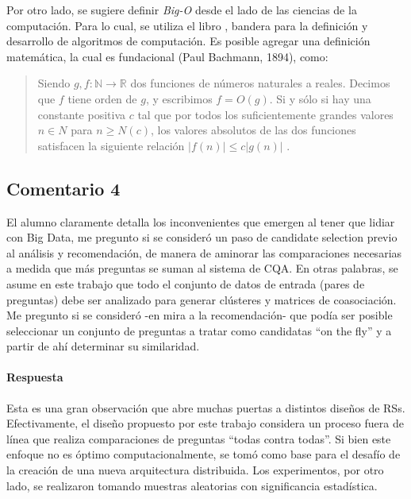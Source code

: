 \bigskip

Por otro lado, se sugiere definir \textit{Big-O} desde el lado de las ciencias de la computación. Para lo cual, se utiliza el libro \citep{cormen2009introduction}, bandera para la definición y desarrollo de algoritmos de computación. Es posible agregar una definición matemática, la cual es fundacional (Paul Bachmann, 1894), como:

\begin{quotation}
	Siendo \(g,f: \mathbb{N} \rightarrow \mathbb{R}\)  dos funciones de números naturales a reales. Decimos que \(f\) tiene orden de \(g\), y escribimos \(f=O(g)\). Si y sólo si hay una constante positiva \(c\) tal que por todos los suficientemente grandes valores \(n \in N\) para \(n \geq N(c)\), los valores absolutos de las dos funciones satisfacen la siguiente relación \(\left | f(n) \right | \leq c\left | g(n) \right |\) \citep{erk2008theoretische}.
\end{quotation}

\subsection*{Comentario 4}
El alumno claramente detalla los inconvenientes que emergen al tener que lidiar con Big Data, me pregunto si se consideró un paso de candidate selection previo al análisis y recomendación, de manera de aminorar las comparaciones necesarias a medida que más preguntas se suman al sistema de CQA. En otras palabras, se asume en este trabajo que todo el conjunto de datos de entrada (pares de preguntas) debe ser analizado para generar clústeres y matrices de coasociación. Me pregunto si se consideró -en mira a la recomendación- que podía ser posible seleccionar un conjunto de preguntas a tratar como candidatas ``on the fly'' y a partir de ahí determinar su similaridad.

\paragraph*{Respuesta}
Esta es una gran observación que abre muchas puertas a distintos diseños de RSs. Efectivamente, el diseño propuesto por este trabajo considera un proceso fuera de línea que realiza comparaciones de preguntas ``todas contra todas''. Si bien este enfoque no es óptimo computacionalmente, se tomó como base para el desafío de la creación de una nueva arquitectura distribuida. Los experimentos, por otro lado, se realizaron tomando muestras aleatorias con significancia estadística.

